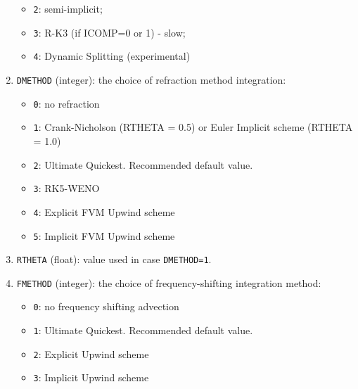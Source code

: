 \documentclass[12pt]{amsart}
\begin{document}
\begin{enumerate}
\begin{itemize}
  \item {\tt 2}: semi-implicit;
  \item {\tt 3}: R-K3 (if ICOMP=0 or 1) - slow;
  \item {\tt 4}: Dynamic Splitting (experimental)
  \end{itemize}
\item {\tt DMETHOD} (integer): the choice of refraction method integration:
  \begin{itemize}
  \item {\tt 0}: no refraction
  \item {\tt 1}: Crank-Nicholson (RTHETA = 0.5) or Euler Implicit scheme (RTHETA = 1.0)
  \item {\tt 2}: Ultimate Quickest. Recommended default value.
  \item {\tt 3}: RK5-WENO
  \item {\tt 4}: Explicit FVM Upwind scheme
  \item {\tt 5}: Implicit FVM Upwind scheme
  \end{itemize}
\item {\tt RTHETA} (float): value used in case {\tt DMETHOD=1}.
\item {\tt FMETHOD} (integer): the choice of frequency-shifting integration method:
  \begin{itemize}
  \item {\tt 0}: no frequency shifting advection
  \item {\tt 1}: Ultimate Quickest. Recommended default value.
  \item {\tt 2}: Explicit Upwind scheme
  \item {\tt 3}: Implicit Upwind scheme
  \end{itemize}
  
    
\end{enumerate}
\end{document}
